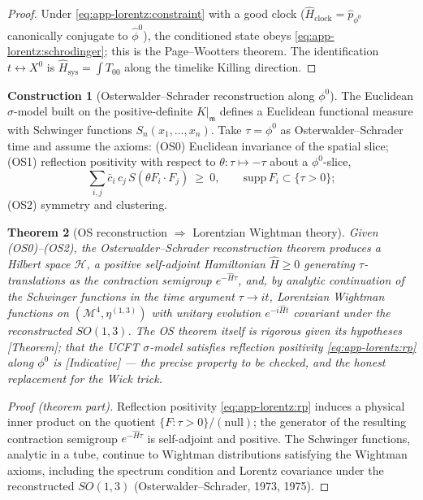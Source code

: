 \documentclass[11pt]{article}
\theoremstyle{plain}
\newtheorem{theorem}{Theorem}[section]
\theoremstyle{definition}
\newtheorem{construction}[theorem]{Construction}
\theoremstyle{remark}
\begin{document}
\begin{proof}
Under \eqref{eq:app-lorentz:constraint} with a good clock
($\hat{H}_{\mathrm{clock}}=\hat{p}_{\phi^{0}}$ canonically conjugate to
$\hat{\phi}^{0}$), the conditioned state obeys \eqref{eq:app-lorentz:schrodinger};
this is the Page--Wootters theorem. The identification $t\leftrightarrow X^{0}$ is
$\hat{H}_{\mathrm{sys}}=\int T_{00}$ along the timelike Killing direction.
\end{proof}

\begin{construction}[Osterwalder--Schrader reconstruction along \texorpdfstring{$\phi^{0}$}{phi0}]
\label{con:app-lorentz:OS}
The Euclidean $\sigma$-model built on the positive-definite $K|_{\mathfrak{m}}$
defines a Euclidean functional measure with Schwinger functions
$S_{n}(x_{1},\dots,x_{n})$. Take $\tau=\phi^{0}$ as Osterwalder--Schrader time and
assume the axioms: (OS0) Euclidean invariance of the spatial slice; (OS1) reflection
positivity with respect to $\theta:\tau\mapsto-\tau$ about a $\phi^{0}$-slice,
\begin{equation}
\label{eq:app-lorentz:rp}
\sum_{i,j}\bar{c}_{i}\,c_{j}\,S\!\left(\theta F_{i}\cdot F_{j}\right)\ \ge\ 0,
\qquad \mathrm{supp}\,F_{i}\subset\{\tau>0\};
\end{equation}
(OS2) symmetry and clustering.
\end{construction}

\begin{theorem}[OS reconstruction \texorpdfstring{$\Rightarrow$}{=>} Lorentzian Wightman theory]
\label{thm:app-lorentz:OS}
Given (OS0)--(OS2), the Osterwalder--Schrader reconstruction theorem produces a
Hilbert space $\mathcal{H}$, a positive self-adjoint Hamiltonian $\hat{H}\ge0$
generating $\tau$-translations as the contraction semigroup $e^{-\hat{H}\tau}$, and,
by analytic continuation of the Schwinger functions in the time argument
$\tau\to it$, Lorentzian Wightman functions on $(\mathcal{M}^{4},\eta^{(1,3)})$ with
unitary evolution $e^{-i\hat{H}t}$ covariant under the reconstructed $SO(1,3)$. The
OS theorem itself is rigorous given its hypotheses \emph{[Theorem]}; that the UCFT
$\sigma$-model \emph{satisfies} reflection positivity \eqref{eq:app-lorentz:rp} along
$\phi^{0}$ is \emph{[Indicative]} --- the precise property to be checked, and the
honest replacement for the Wick trick.
\end{theorem}

\begin{proof}[Proof (theorem part)]
Reflection positivity \eqref{eq:app-lorentz:rp} induces a physical inner product on
the quotient $\{F:\tau>0\}/(\text{null})$; the generator of the resulting contraction
semigroup $e^{-\hat{H}\tau}$ is self-adjoint and positive. The Schwinger functions,
analytic in a tube, continue to Wightman distributions satisfying the Wightman axioms,
including the spectrum condition and Lorentz covariance under the reconstructed
$SO(1,3)$ (Osterwalder--Schrader, 1973, 1975).
\end{proof}
\end{document}
